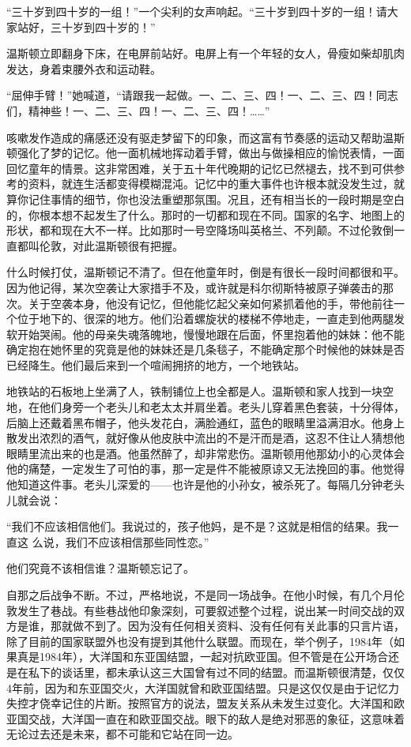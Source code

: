 ``三十岁到四十岁的一组！''一个尖利的女声响起。``三十岁到四十岁的一组！请大家站好，三十岁到四十岁的！''

温斯顿立即翻身下床，在电屏前站好。电屏上有一个年轻的女人，骨瘦如柴却肌肉发达，身着束腰外衣和运动鞋。

``屈伸手臂！''她喊道，``请跟我一起做。一、二、三、四！一、二、三、四！同志们，精神些！一、二、三、四！一、二、三、四！\ldots\ldots''

咳嗽发作造成的痛感还没有驱走梦留下的印象，而这富有节奏感的运动又帮助温斯顿强化了梦的记忆。他一面机械地挥动着手臂，做出与做操相应的愉悦表情，一面回忆童年的情景。这非常困难，关于五十年代晚期的记忆已然褪去，找不到可供参考的资料，就连生活都变得模糊混沌。记忆中的重大事件也许根本就没发生过，就算你记住事情的细节，你也没法重塑那氛围。况且，还有相当长的一段时期是空白的，你根本想不起发生了什么。那时的一切都和现在不同。国家的名字、地图上的形状，都和现在大不一样。比如那时一号空降场叫英格兰、不列颠。不过伦敦倒一直都叫伦敦，对此温斯顿很有把握。

什么时候打仗，温斯顿记不清了。但在他童年时，倒是有很长一段时间都很和平。因为他记得，某次空袭让大家措手不及，或许就是科尔彻斯特被原子弹袭击的那次。关于空袭本身，他没有记忆，但他能忆起父亲如何紧抓着他的手，带他前往一个位于地下的、很深的地方。他们沿着螺旋状的楼梯不停地走，一直走到他两腿发软开始哭闹。他的母亲失魂落魄地，慢慢地跟在后面，怀里抱着他的妹妹：他不能确定抱在她怀里的究竟是他的妹妹还是几条毯子，不能确定那个时候他的妹妹是否已经降生。他们最后来到一个喧闹拥挤的地方，一个地铁站。

地铁站的石板地上坐满了人，铁制铺位上也全都是人。温斯顿和家人找到一块空地，在他们身旁一个老头儿和老太太并肩坐着。老头儿穿着黑色套装，十分得体，后脑上还戴着黑布帽子，他头发花白，满脸通红，蓝色的眼睛里溢满泪水。他身上散发出浓烈的酒气，就好像从他皮肤中流出的不是汗而是酒，这忍不住让人猜想他眼睛里流出来的也是酒。他虽然醉了，却非常悲伤。温斯顿用他那幼小的心灵体会他的痛楚，一定发生了可怕的事，那一定是件不能被原谅又无法挽回的事。他觉得他知道这件事。老头儿深爱的——也许是他的小孙女，被杀死了。每隔几分钟老头儿就会说：

``我们不应该相信他们。我说过的，孩子他妈，是不是？这就是相信的结果。我一直这
么说，我们不应该相信那些同性恋。''

他们究竟不该相信谁？温斯顿忘记了。

自那之后战争不断。不过，严格地说，不是同一场战争。在他小时候，有几个月伦敦发生了巷战。有些巷战他印象深刻，可要叙述整个过程，说出某一时间交战的双方是谁，那就做不到了。因为没有任何相关资料、没有任何有关此事的只言片语，除了目前的国家联盟外也没有提到其他什么联盟。而现在，举个例子，1984年（如果真是1984年），大洋国和东亚国结盟，一起对抗欧亚国。但不管是在公开场合还是在私下的谈话里，都未承认这三大国曾有过不同的结盟。而温斯顿很清楚，仅仅4年前，因为和东亚国交火，大洋国就曾和欧亚国结盟。只是这仅仅是由于记忆力失控才侥幸记住的片断。按照官方的说法，盟友关系从未发生过变化。大洋国和欧亚国交战，大洋国一直在和欧亚国交战。眼下的敌人是绝对邪恶的象征，这意味着无论过去还是未来，都不可能和它站在同一边。

